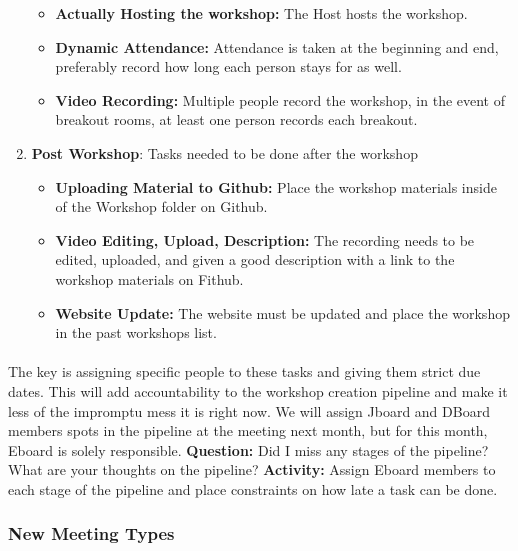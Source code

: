 \documentclass{article}
\begin{document}
\begin{enumerate}
    \begin{itemize}
        \item \textbf{Actually Hosting the workshop:} The Host hosts the workshop.
        \item \textbf{Dynamic Attendance:} Attendance is taken at the beginning and end, preferably record how long each person stays for as well. 
        \item \textbf{Video Recording:} Multiple people record the workshop, in the event of breakout rooms, at least one person records each breakout. 
    \end{itemize}
    \item \textbf{Post Workshop}: Tasks needed to be done after the workshop
    \begin{itemize}
        \item \textbf{Uploading Material to Github:} Place the workshop materials inside of the Workshop folder on Github. 
        \item \textbf{Video Editing, Upload, Description:} The recording needs to be edited, uploaded, and given a good description with a link to the workshop materials on Fithub. 
        \item \textbf{Website Update:} The website must be updated and place the workshop in the past workshops list.
    \end{itemize}
\end{enumerate}

\paragraph{}
The key is assigning specific people to these tasks and giving them strict due dates. This will add accountability to the workshop creation pipeline and make it less of the impromptu mess it is right now. We will assign Jboard and DBoard members spots in the pipeline at the meeting next month, but for this month, Eboard is solely responsible. 
\newline\newline
\textbf{Question:} Did I miss any stages of the pipeline? What are your thoughts on the pipeline?
\newline\newline
\textbf{Activity:} Assign Eboard members to each stage of the pipeline and place constraints on how late a task can be done. 

\subsubsection{New Meeting Types}
\end{document}
